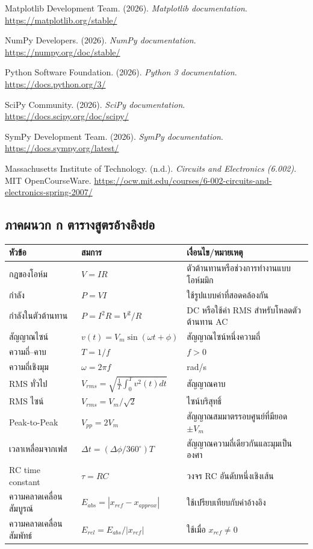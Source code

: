 Matplotlib Development Team. (2026). \textit{Matplotlib documentation}. \url{https://matplotlib.org/stable/}

NumPy Developers. (2026). \textit{NumPy documentation}. \url{https://numpy.org/doc/stable/}

Python Software Foundation. (2026). \textit{Python 3 documentation}. \url{https://docs.python.org/3/}

SciPy Community. (2026). \textit{SciPy documentation}. \url{https://docs.scipy.org/doc/scipy/}

SymPy Development Team. (2026). \textit{SymPy documentation}. \url{https://docs.sympy.org/latest/}

Massachusetts Institute of Technology. (n.d.). \textit{Circuits and Electronics (6.002)}. MIT OpenCourseWare. \url{https://ocw.mit.edu/courses/6-002-circuits-and-electronics-spring-2007/}

 

\subsection{ภาคผนวก ก ตารางสูตรอ้างอิงย่อ}

\begin{table}[htbp]
    \centering
    \begin{tabular}{l l l}
        \hline
        \textbf{หัวข้อ} & \textbf{สมการ} & \textbf{เงื่อนไข/หมายเหตุ} \\
        \hline
        กฎของโอห์ม & $V=IR$ & ตัวต้านทานหรือช่วงการทำงานแบบโอห์มมิก \\
        กำลัง & $P=VI$ & ใช้รูปแบบค่าที่สอดคล้องกัน \\
        กำลังในตัวต้านทาน & $P=I^2R=V^2/R$ & DC หรือใช้ค่า RMS สำหรับโหลดตัวต้านทาน AC \\
        สัญญาณไซน์ & $v(t)=V_m\sin(\omega t+\phi)$ & สัญญาณไซน์หนึ่งความถี่ \\
        ความถี่–คาบ & $T=1/f$ & $f>0$ \\
        ความถี่เชิงมุม & $\omega=2\pi f$ & rad/s \\
        RMS ทั่วไป & $V_{rms}=\sqrt{\frac{1}{T}\int_0^T v^2(t)dt}$ & สัญญาณคาบ \\
        RMS ไซน์ & $V_{rms}=V_m/\sqrt{2}$ & ไซน์บริสุทธิ์ \\
        Peak-to-Peak & $V_{pp}=2V_m$ & สัญญาณสมมาตรรอบศูนย์ที่มียอด $\pm V_m$ \\
        เวลาเหลื่อมจากเฟส & $\Delta t=(\Delta\phi/360^\circ)T$ & สัญญาณความถี่เดียวกันและมุมเป็นองศา \\
        RC time constant & $\tau=RC$ & วงจร RC อันดับหนึ่งเชิงเส้น \\
        ความคลาดเคลื่อนสัมบูรณ์ & $E_{abs}=|x_{ref}-x_{approx}|$ & ใช้เปรียบเทียบกับค่าอ้างอิง \\
        ความคลาดเคลื่อนสัมพัทธ์ & $E_{rel}=E_{abs}/|x_{ref}|$ & ใช้เมื่อ $x_{ref}\neq0$ \\
        \hline
    \end{tabular}
\end{table}

